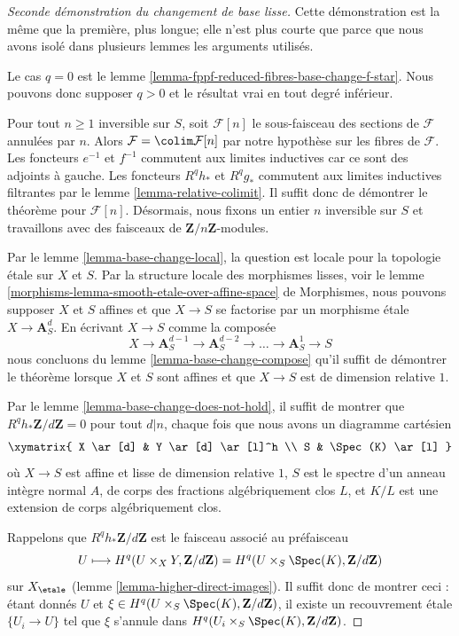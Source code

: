 \begin{proof}[Seconde démonstration du changement de base lisse]
Cette démonstration est la même que la première, plus longue;
elle n'est plus courte que parce que nous avons isolé dans plusieurs
lemmes les arguments utilisés.

\medskip\noindent
Le cas $q = 0$ est le
lemme \ref{lemma-fppf-reduced-fibres-base-change-f-star}.
Nous pouvons donc supposer $q > 0$ et le résultat vrai
en tout degré inférieur.

\medskip\noindent
Pour tout $n \geq 1$ inversible sur $S$, soit $\mathcal{F}[n]$
le sous-faisceau des sections de $\mathcal{F}$ annulées par $n$. Alors
$\mathcal{F} = \colim \mathcal{F}[n]$ par notre hypothèse sur
les fibres de $\mathcal{F}$. Les foncteurs $e^{-1}$ et $f^{-1}$
commutent aux limites inductives car ce sont des adjoints à gauche. Les foncteurs
$R^qh_*$ et $R^qg_*$ commutent aux limites inductives filtrantes par le
lemme \ref{lemma-relative-colimit}.
Il suffit donc de démontrer le théorème pour $\mathcal{F}[n]$.
Désormais, nous fixons un entier $n$ inversible sur $S$ et travaillons avec des
faisceaux de $\mathbf{Z}/n\mathbf{Z}$-modules.

\medskip\noindent
Par le lemme \ref{lemma-base-change-local}, la question est locale pour la topologie étale
sur $X$ et $S$. Par la structure locale des morphismes lisses, voir le
lemme \ref{morphisms-lemma-smooth-etale-over-affine-space} de Morphismes,
nous pouvons supposer $X$ et $S$ affines et que $X \to S$
se factorise par un morphisme étale $X \to \mathbf{A}^d_S$.
En écrivant $X \to S$ comme la composée
$$
X \to \mathbf{A}^{d - 1}_S \to \mathbf{A}^{d - 2}_S \to \ldots \to
\mathbf{A}^1_S \to S
$$
nous concluons du lemme \ref{lemma-base-change-compose}
qu'il suffit de démontrer le théorème lorsque $X$ et $S$
sont affines et que $X \to S$ est de dimension relative $1$.

\medskip\noindent
Par le lemme \ref{lemma-base-change-does-not-hold}, il suffit de montrer que
$R^qh_*\mathbf{Z}/d\mathbf{Z} = 0$ pour tout $d | n$, chaque fois que nous avons un
diagramme cartésien
$$
\xymatrix{
X \ar[d] & Y \ar[d] \ar[l]^h \\
S & \Spec(K) \ar[l]
}
$$
où $X \to S$ est affine et lisse de dimension relative $1$,
$S$ est le spectre d'un anneau intègre
normal $A$, de corps des fractions algébriquement clos $L$,
et $K/L$ est une extension de corps algébriquement clos.

\medskip\noindent
Rappelons que $R^qh_*\mathbf{Z}/d\mathbf{Z}$ est le faisceau associé
au préfaisceau
$$
U \longmapsto
H^q(U \times_X Y, \mathbf{Z}/d\mathbf{Z}) =
H^q(U \times_S \Spec(K), \mathbf{Z}/d\mathbf{Z})
$$
sur $X_\etale$ (lemme \ref{lemma-higher-direct-images}).
Il suffit donc de montrer ceci : étant donnés $U$ et
$\xi \in H^q(U \times_S \Spec(K), \mathbf{Z}/d\mathbf{Z})$,
il existe un recouvrement étale $\{U_i \to U\}$
tel que $\xi$ s'annule dans $H^q(U_i \times_S \Spec(K), \mathbf{Z}/d\mathbf{Z})$.


\end{proof}
